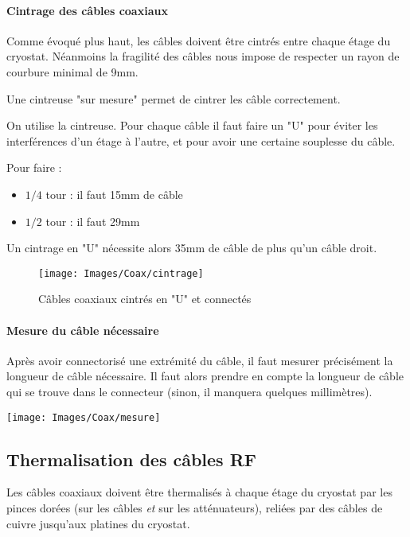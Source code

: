 \paragraph*{Cintrage des câbles coaxiaux} Comme évoqué plus haut, les câbles doivent être cintrés entre chaque étage du cryostat. Néanmoins la fragilité des câbles nous impose de respecter un rayon de courbure minimal de 9mm.

Une cintreuse "sur mesure" permet de cintrer les câble correctement.

On utilise la cintreuse. Pour chaque câble il faut faire un "U" pour éviter les interférences d'un étage à l'autre, et pour avoir une certaine souplesse du câble.

Pour faire : 
\begin{itemize}
    \item $1/4$ tour : il faut 15mm de câble
    \item $1/2$ tour : il faut 29mm
\end{itemize}
Un cintrage en "U" nécessite alors 35mm de câble de plus qu'un câble droit.


\begin{figure}[h]
    \begin{center}
        \texttt{[image: Images/Coax/cintrage]}
        \caption{Câbles coaxiaux cintrés en "U" et connectés}
        \label{coax_cintrage}
    \end{center}
\end{figure}

\newpage
\paragraph*{Mesure du câble nécessaire} Après avoir connectorisé une extrémité du câble, il faut mesurer précisément la longueur de câble nécessaire. Il faut alors prendre en compte la longueur de câble qui se trouve dans le connecteur (sinon, il manquera quelques millimètres).

\begin{center}
    \texttt{[image: Images/Coax/mesure]}
    \label{coax_mesure}
\end{center}



\subsection{Thermalisation des câbles RF}
Les câbles coaxiaux doivent être thermalisés à chaque étage du cryostat par les pinces dorées (sur les câbles \textit{et} sur les atténuateurs), reliées par des câbles de cuivre jusqu’aux platines du cryostat.

